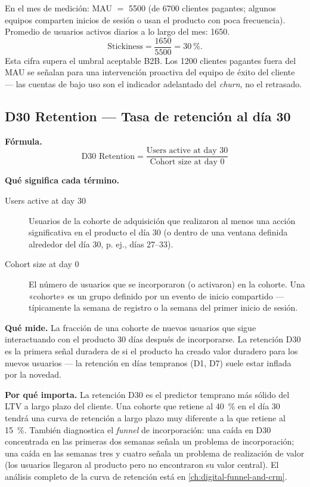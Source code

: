 \begin{example}
En el mes de medición: MAU $=$ \num{5500} (de \num{6700} clientes pagantes; algunos equipos
comparten inicios de sesión o usan el producto con poca frecuencia). Promedio de usuarios
activos diarios a lo largo del mes: \num{1650}.
\[
  \text{Stickiness} = \frac{1650}{5500} = \qty{30}{\percent}.
\]
Esta cifra supera el umbral aceptable B2B. Los \num{1200} clientes pagantes fuera del MAU se
señalan para una intervención proactiva del equipo de éxito del cliente --- las cuentas de
bajo uso son el indicador adelantado del \emph{churn}, no el retrasado.
\end{example}


\subsection{D30 Retention --- Tasa de retención al día 30}

\textbf{Fórmula.}
\[
  \text{D30 Retention} = \frac{\text{Users active at day 30}}{\text{Cohort size at day 0}}
\]

\textbf{Qué significa cada término.}
\begin{description}
  \item[Users active at day 30] Usuarios de la cohorte de adquisición que realizaron al
    menos una acción significativa en el producto el día 30 (o dentro de una ventana definida
    alrededor del día 30, p. ej., días 27--33).
  \item[Cohort size at day 0] El número de usuarios que se incorporaron (o activaron) en la
    cohorte. Una «cohorte» es un grupo definido por un evento de inicio compartido ---
    típicamente la semana de registro o la semana del primer inicio de sesión.
\end{description}

\textbf{Qué mide.} La fracción de una cohorte de nuevos usuarios que sigue interactuando con
el producto 30 días después de incorporarse. La retención D30 es la primera señal duradera
de si el producto ha creado valor duradero para los nuevos usuarios --- la retención en días
tempranos (D1, D7) suele estar inflada por la novedad.

\textbf{Por qué importa.} La retención D30 es el predictor temprano más sólido del LTV a
largo plazo del cliente. Una cohorte que retiene al \qty{40}{\percent} en el día 30 tendrá
una curva de retención a largo plazo muy diferente a la que retiene al \qty{15}{\percent}.
También diagnostica el \emph{funnel} de incorporación: una caída en D30 concentrada en las
primeras dos semanas señala un problema de incorporación; una caída en las semanas tres y
cuatro señala un problema de realización de valor (los usuarios llegaron al producto pero no
encontraron su valor central). El análisis completo de la curva de retención está en
\cref{ch:digital-funnel-and-crm}.

